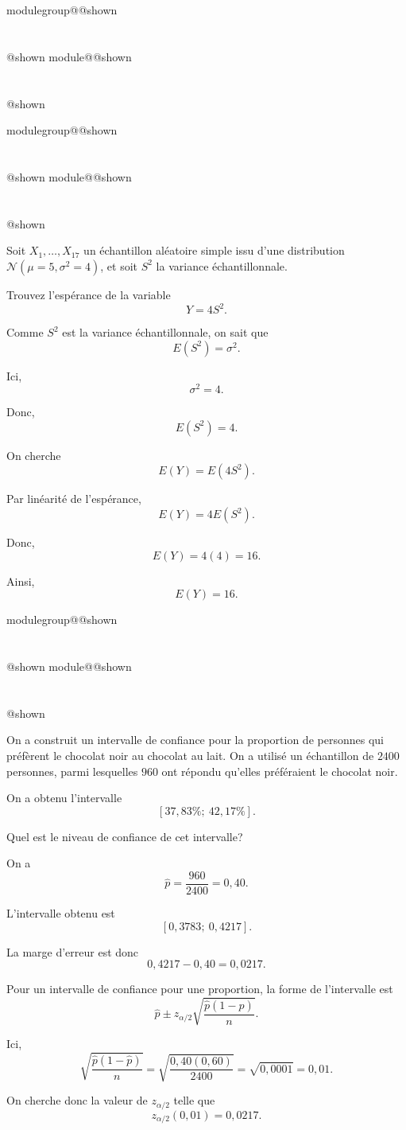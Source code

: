\documentclass{Evaluation}
\makeatletter
\newcommand{\currentmodulekey}{}
\newcommand{\currentmoduletitle}{}
\newcommand{\currentgroupkey}{}
\newcommand{\currentgrouptitle}{}
\newcommand{\showmoduleifneeded}{%
  \ifx\currentgroupkey\empty\else
    \expandafter\ifx\csname modulegroup@\currentgroupkey @shown\endcsname\relax
      \section*{\currentgrouptitle}%
      \expandafter\gdef\csname modulegroup@\currentgroupkey @shown\endcsname{1}%
    \fi
  \fi
  \expandafter\ifx\csname module@\currentmodulekey @shown\endcsname\relax
    \section*{\currentmoduletitle}%
    \expandafter\gdef\csname module@\currentmodulekey @shown\endcsname{1}%
  \fi
}
\newenvironment{H26}{\showmoduleifneeded}{}
\newenvironment{H26r}{\showmoduleifneeded}{}
\makeatother
\begin{document}
\begin{questions}
\begin{H26}
\begin{parts}
\end{parts}
\end{H26}

\begin{H26r}
\question {} %
Soit \(X_1,\ldots,X_{17}\) un échantillon aléatoire simple issu d'une distribution $\mathcal{N}(\mu=5,\sigma^2=4)$,
et soit \(S^2\) la variance échantillonnale.

Trouvez l'espérance de la variable
\[
Y=4S^2.
\]

\begin{solution}
Comme \(S^2\) est la variance échantillonnale, on sait que
\[
E(S^2)=\sigma^2.
\]

Ici,
\[
\sigma^2=4.
\]

Donc,
\[
E(S^2)=4.
\]

On cherche
\[
E(Y)=E(4S^2).
\]

Par linéarité de l'espérance,
\[
E(Y)=4E(S^2).
\]

Donc,
\[
E(Y)=4(4)=16.
\]

Ainsi,
\[
\boxed{E(Y)=16.}
\]
\end{solution}
\end{H26r}

\begin{H26r}
\question {} %
On a construit un intervalle de confiance pour la proportion de personnes qui préfèrent le chocolat noir au chocolat au lait. On a utilisé un échantillon de \(2400\) personnes, parmi lesquelles \(960\) ont répondu qu'elles préféraient le chocolat noir.

On a obtenu l'intervalle
\[
[37{,}83\%;\ 42{,}17\%].
\]

Quel est le niveau de confiance de cet intervalle?

\begin{solution}
On a
\[
\hat{p}=\frac{960}{2400}=0{,}40.
\]

L'intervalle obtenu est
\[
[0{,}3783;\ 0{,}4217].
\]

La marge d'erreur est donc
\[
0{,}4217-0{,}40=0{,}0217.
\]

Pour un intervalle de confiance pour une proportion, la forme de l'intervalle est
\[
\hat{p}\pm z_{\alpha/2}\sqrt{\frac{\hat{p}(1-\hat{p})}{n}}.
\]

Ici,
\[
\sqrt{\frac{\hat{p}(1-\hat{p})}{n}}
=
\sqrt{\frac{0{,}40(0{,}60)}{2400}}
=
\sqrt{0{,}0001}
=
0{,}01.
\]

On cherche donc la valeur de \(z_{\alpha/2}\) telle que
\[
z_{\alpha/2}(0{,}01)=0{,}0217.
\]


\end{solution}
\end{H26r}
\end{questions}
\end{document}
